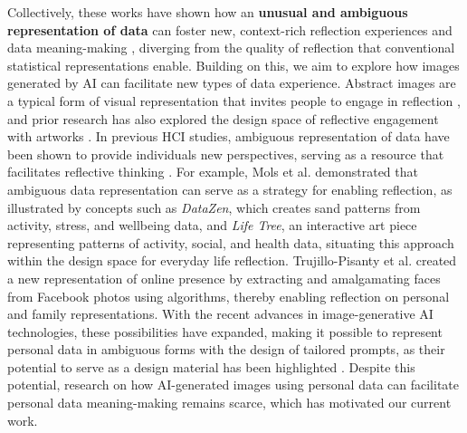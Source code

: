 Collectively, these works have shown how an \textbf{unusual and ambiguous representation of data} can foster new, context-rich reflection experiences and data meaning-making \cite{wang2015design,kang2017fostering}, diverging from the quality of reflection that conventional statistical representations enable. Building on this, we aim to explore how images generated by AI can facilitate new types of data experience. Abstract images are a typical form of visual representation that invites people to engage in reflection \cite{huh2007use, dalsgaard2008designing, fan2012spark}, and prior research has also explored the design space of reflective engagement with artworks \cite{gorichanaz2020engaging}. In previous HCI studies, ambiguous representation of data have been shown to provide individuals new perspectives, serving as a resource that facilitates reflective thinking \cite{bentvelzen2022revisiting,nunez2014aesthetic,lindstrom2006affective,trujillo2014admixed,durrant2018admixed, mols2016technologies}. For example, Mols et al. \cite{mols2016technologies} demonstrated that ambiguous data representation can serve as a strategy for enabling reflection, as illustrated by concepts such as \textit{DataZen}, which creates sand patterns from activity, stress, and wellbeing data, and \textit{Life Tree}, an interactive art piece representing patterns of activity, social, and health data, situating this approach within the design space for everyday life reflection. Trujillo-Pisanty et al. \cite{trujillo2014admixed} created a new representation of online presence by extracting and amalgamating faces from Facebook photos using algorithms, thereby enabling reflection on personal and family representations. With the recent advances in image-generative AI technologies, these possibilities have expanded, making it possible to represent personal data in ambiguous forms \cite{rajcic2020mirror,rajcic2023message} with the design of tailored prompts, as their potential to serve as a design material has been highlighted \cite{benjamin2021machine,sivertsen2024machine,yurman2022drawing}. Despite this potential, research on how AI-generated images using personal data can facilitate personal data meaning-making remains scarce, which has motivated our current work.

